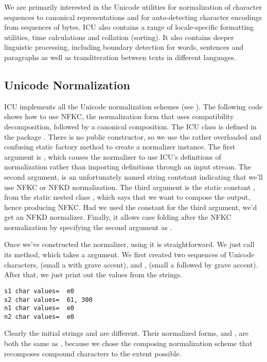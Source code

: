 We are primarily interested in the Unicode utilities for normalization
of character sequences to canonical representations and for
auto-detecting character encodings from sequences of bytes.  ICU also
contains a range of locale-specific formatting utilities, time
calculations and collation (sorting).  It also contains deeper
linguistic processing, including boundary detection for words,
sentences and paragraphs as well as transliteration between texts in
different languages.

\subsection{Unicode Normalization}\label{section:icu-unicode-normalization}

ICU implements all the Unicode normalization schemes (see
).  The following code shows how to use NFKC,
the normalization form that uses compatibility decomposition, followed
by a canonical composition.
%
%
The ICU class  is defined in the package
.  There is no public constructor, so we use the
rather overloaded and confusing static factory method
 to create a normalizer instance.  The first
argument is , which causes the normalizer to use ICU's
definitions of normalization rather than importing definitions through
an input stream.  The second argument,  is an
unfortunately named string contstant indicating that we'll use NFKC or
NFKD normalization.  The third argument is the static constant
, from the static nested class ,
which says that we want to compose the output, hence producing NFKC.
Had we used the constant  for the third argument, we'd
get an NFKD normalizer.  Finally, it allows case folding after the NFKC normalization
by specifying the second argument as .  

Once we've constructed the normalizer, using it is straightforward.
We just call its  method, which takes a
 argument.  We first created two sequences of Unicode
characters,  (small a with grave accent), and
,  (small a followed by grave accent).
After that, we just print out the  values from the
strings.

\begin{verbatim}
s1 char values=  e0
s2 char values=  61, 300
n1 char values=  e0
n2 char values=  e0
\end{verbatim}
%
Clearly the initial strings  and  are different.
Their normalized forms,  and , are both the same as
, because we chose the composing normalization scheme that
recomposes compound characters to the extent possible.


